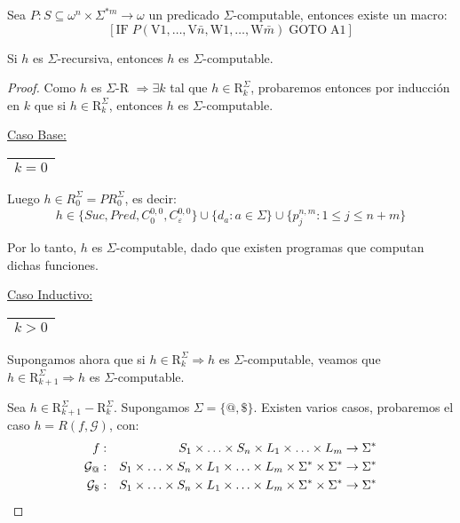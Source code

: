   \begin{proposition}
    \PN Sea $P: S \subseteq \omega^{n} \times \Sigma^{\ast m} \rightarrow \omega$ un predicado $\Sigma$-computable,
    entonces existe un macro:
    \[
      \left[\mathrm{IF} \; P(\mathrm{V}1,\dotsc,\mathrm{V}\bar{n},\mathrm{W}1,\dotsc,\mathrm{W}\bar{m}) \; \mathrm{GOTO}
      \; \mathrm{A}1\right]
    \]
  \end{proposition}

  \begin{theorem}
    \PN Si $h$ es $\Sigma$-recursiva, entonces $h$ es $\Sigma$-computable.
  \end{theorem}
  \begin{proof}
    \PN Como $h$ es $\Sigma$-R $\Rightarrow \exists k$ tal que $h \in \mathrm{R}_{k}^{\Sigma}$, probaremos entonces por
    inducción en $k$ que si $h \in \mathrm{R}_{k}^{\Sigma}$, entonces $h$ es $\Sigma$-computable.

    \vspace{3mm}
    \PN \underline{Caso Base:} \begin{tabular}{|c|} \hline $k = 0$ \\\hline \end{tabular}

    \vspace{1mm}
    \PN Luego $h \in R_{0}^{\Sigma} = PR_{0}^{\Sigma}$, es decir:
    \[
      h \in \{Suc, Pred, C_{0}^{0,0}, C_{\varepsilon}^{0,0}\} \cup \{d_{a}: a \in \Sigma\} \cup \{p_{j}^{n,m} : 1 \leq j
      \leq n+m\}
    \]

    \PN Por lo tanto, $h$ es $\Sigma$-computable, dado que existen programas que computan dichas funciones.

    \vspace{3mm}
		\PN \underline{Caso Inductivo:} \begin{tabular}{|c|} \hline $k > 0$ \\\hline \end{tabular}

    \PN Supongamos ahora que si $h \in \mathrm{R}_{k}^{\Sigma} \Rightarrow h$ es $\Sigma$-computable, veamos que $h \in
    \mathrm{R}_{k+1}^{\Sigma} \Rightarrow h$ es $\Sigma$-computable.

    \PN Sea $h \in \mathrm{R}_{k+1}^{\Sigma} - \mathrm{R}_{k}^{\Sigma}$. Supongamos $\Sigma = \{@, \$\}$. Existen varios
    casos, probaremos el caso $h=R(f,\mathcal{G})$, con:
    \begin{eqnarray*}
      f &:& S_{1 }\times \dotsc \times S_{n} \times L_{1} \times \dotsc \times L_{m} \rightarrow \Sigma^{\ast} \\
      \mathcal{G}_{@} &:& S_{1} \times \dotsc \times S_{n} \times L_{1} \times \dotsc \times L_{m} \times \Sigma^{\ast} \times
        \Sigma^{\ast} \rightarrow \Sigma^{\ast} \\
      \mathcal{G}_{\$} &:& S_{1} \times \dotsc \times S_{n} \times L_{1} \times \dotsc \times L_{m} \times \Sigma^{\ast} \times
        \Sigma^{\ast} \rightarrow \Sigma^{\ast}
    \end{eqnarray*}


\end{proof}
